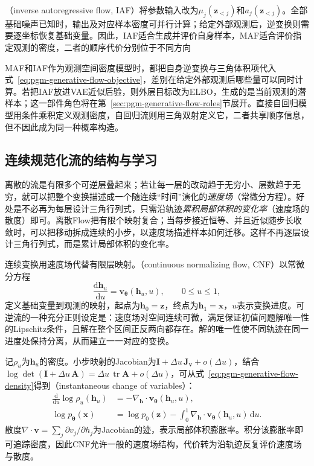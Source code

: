 （inverse autoregressive flow, IAF）将参数输入改为$\mu_j(\bm{z}_{<j})$和$a_j(\bm{z}_{<j})$。全部基础噪声已知时，输出及对应样本密度可并行计算；给定外部观测后，逆变换则需要逐坐标恢复基础变量。因此，IAF适合生成并评价自身样本，MAF适合评价指定观测的密度，二者的顺序代价分别位于不同方向

MAF和IAF作为观测空间密度模型时，都把自身逆变换与三角体积项代入式~\eqref{eq:pgm-generative-flow-objective}，差别在给定外部观测后哪些量可以同时计算。若把IAF放进VAE近似后验，则外层目标改为ELBO，生成的是当前观测的潜样本；这一部件角色将在第~\ref{sec:pgm-generative-flow-roles}节展开。直接自回归模型用条件乘积定义观测密度，自回归流则用三角双射定义它，二者共享顺序信息，但不因此成为同一种概率构造。

\subsection{连续规范化流的结构与学习}
\label{sec:pgm-generative-cnf}

离散的流是有限多个可逆层叠起来；若让每一层的改动趋于无穷小、层数趋于无穷，就可以把整个变换描述成一个随连续“时间”演化的\emph{速度场}（常微分方程）。好处是不必再为每层设计三角行列式，只需沿轨迹\emph{累积局部体积的变化率}（速度场的散度）即可。离散Flow把有限个映射复合；当每步接近恒等、并且近似随步长收敛时，可以把移动拆成连续的小步，以速度场描述样本如何迁移。这样不再逐层设计三角行列式，而是累计局部体积的变化率。

连续变换用速度场代替有限层映射。（continuous normalizing flow, CNF）以常微分方程
\[
  \frac{\mathrm{d}\bm{h}_u}{\mathrm{d}u}
    =\bm{v}_{\bm{\theta}}(\bm{h}_u,u),
  \qquad 0\leq u\leq1,
\]
定义基础变量到观测的映射，起点为$\bm{h}_0=\bm{z}$，终点为$\bm{h}_1=\bm{x}$，$u$表示变换进度。可逆流的一种充分正则设定是：速度场对空间连续可微，满足保证初值问题解唯一性的Lipschitz条件，且解在整个区间正反两向都存在。解的唯一性使不同轨迹在同一进度处保持分离，从而建立一一对应的变换。

记$\rho_u$为$\bm{h}_u$的密度。小步映射的Jacobian为$\bm{I}+\Delta u\,\bm{J}_{\bm{v}}+o(\Delta u)$，结合$\log\det(\bm{I}+\Delta u\,\bm{A})=\Delta u\,\operatorname{tr}\bm{A}+o(\Delta u)$，可从式~\eqref{eq:pgm-generative-flow-density}得到（instantaneous change of variables）：
\begin{equation}
  \label{eq:pgm-generative-instantaneous-change}
  \begin{aligned}
    \frac{\mathrm{d}}{\mathrm{d}u}
         \log\rho_u(\bm{h}_u)
       &=-\nabla_{\bm{h}}\!\cdot
          \bm{v}_{\bm{\theta}}(\bm{h}_u,u),\\
    \log p_{\bm{\theta}}(\bm{x})
       &=\log p_0(\bm{z})
         -\int_0^1\nabla_{\bm{h}}\!\cdot
           \bm{v}_{\bm{\theta}}(\bm{h}_u,u)\,\mathrm{d}u.
  \end{aligned}
\end{equation}
散度$\nabla\cdot\bm{v}=\sum_j\partial v_j/\partial h_j$为Jacobian的迹，表示局部体积膨胀率。积分该膨胀率即可追踪密度，因此CNF允许一般的速度场结构，代价转为沿轨迹反复评价速度场与散度。

